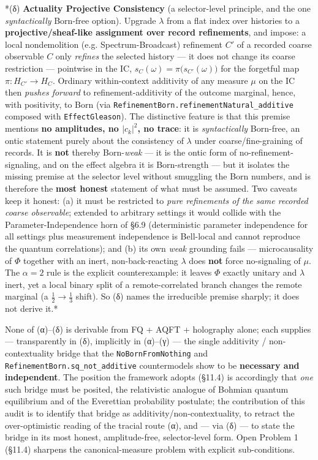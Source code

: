 \documentclass[11pt,a4paper]{article}
\begin{document}
*(δ) \textbf{Actuality Projective Consistency} (a selector-level principle, and the one \emph{syntactically} Born-free option). Upgrade $\lambda$ from a flat index over histories to a \textbf{projective/sheaf-like assignment over record refinements}, and impose: a local nondemolition (e.g. Spectrum-Broadcast) refinement $C'$ of a recorded coarse observable $C$ only \emph{refines} the selected history — it does not change its coarse restriction — pointwise in the IC, $s_C(\omega)=\pi\!\big(s_{C'}(\omega)\big)$ for the forgetful map $\pi:H_{C'}\to H_C$. Ordinary within-context additivity of any measure $\mu$ on the IC then \emph{pushes forward} to refinement-additivity of the outcome marginal, hence, with positivity, to Born (via \texttt{RefinementBorn.refinementNatural\_additive} composed with \texttt{EffectGleason}). The distinctive feature is that this premise mentions \textbf{no amplitudes, no $|c_k|^2$, no trace}: it is \emph{syntactically} Born-free, an ontic statement purely about the consistency of $\lambda$ under coarse/fine-graining of records. It is \textbf{not} thereby Born-\emph{weak} — it is the ontic form of no-refinement-signaling, and on the effect algebra it is Born-strength — but it isolates the missing premise at the selector level without smuggling the Born numbers, and is therefore the \textbf{most honest} statement of what must be assumed. Two caveats keep it honest: (a) it must be restricted to \emph{pure refinements of the same recorded coarse observable}; extended to arbitrary settings it would collide with the Parameter-Independence horn of §6.9 (deterministic parameter independence for all settings plus measurement independence is Bell-local and cannot reproduce the quantum correlations); and (b) its own \emph{weak} grounding fails — microcausality of $\Phi$ together with an inert, non-back-reacting $\lambda$ does \textbf{not} force no-signaling of $\mu$. The $\alpha=2$ rule is the explicit counterexample: it leaves $\Phi$ exactly unitary and $\lambda$ inert, yet a local binary split of a remote-correlated branch changes the remote marginal (a $\tfrac12\!\to\!\tfrac13$ shift). So (δ) names the irreducible premise sharply; it does not derive it.*

None of (α)–(δ) is derivable from FQ + AQFT + holography alone; each supplies — transparently in (δ), implicitly in (α)–(γ) — the single additivity / non-contextuality bridge that the \texttt{NoBornFromNothing} and \texttt{RefinementBorn.sq\_not\_additive} countermodels show to be \textbf{necessary and independent}. The position the framework adopts (§11.4) is accordingly that \emph{one} such bridge must be posited, the relativistic analogue of Bohmian quantum equilibrium and of the Everettian probability postulate; the contribution of this audit is to identify that bridge as additivity/non-contextuality, to retract the over-optimistic reading of the tracial route (α), and — via (δ) — to state the bridge in its most honest, amplitude-free, selector-level form. Open Problem 1 (§11.4) sharpens the canonical-measure problem with explicit sub-conditions.
\end{document}
